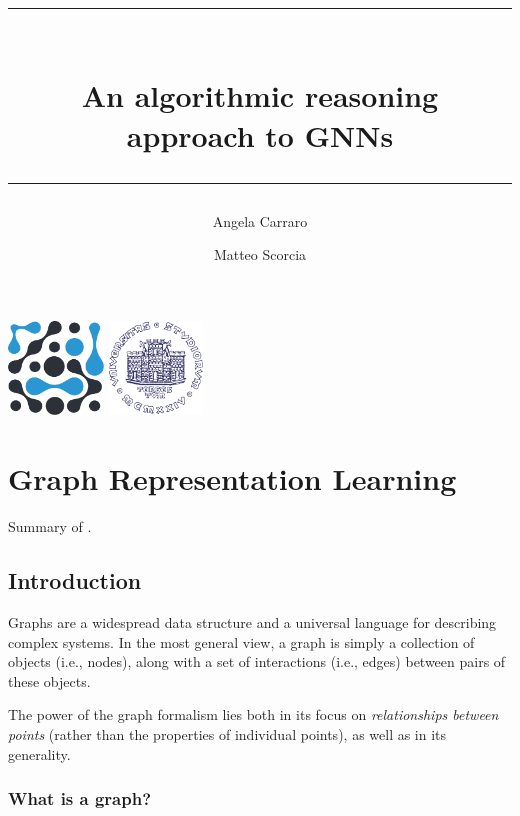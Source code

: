 \documentclass[10pt]{book}
\title{\rule{\textwidth}{0.4pt}\\\huge{An algorithmic reasoning\\approach to GNNs}\\\rule{\textwidth}{0.4pt}}
\author{\Large{Angela Carraro}}
\author{\Large{Matteo Scorcia}}
\affil{\Large{DSSC + IN20 - UniTS}}
\date{}
\begin{document}
\begin{minipage}[c][\textheight]{\textwidth}
    \maketitle
    
    \hspace*{20cm}

    \centering
    \includegraphics[height=2.5cm]{figures/logo_dssc_alt.pdf}
    \hspace*{1cm}
    \includegraphics[height=2.5cm]{figures/Logo_units_blu.pdf}

\end{minipage}
\newpage

\tableofcontents

\newpage

\chapter{Graph Representation Learning}

Summary of \cite{BookHamiltonGRL}.

\section{Introduction}
\label{sec:intro}

Graphs are a widespread data structure and a universal language for describing complex systems. In the most general view, a graph is simply a collection of objects (i.e., nodes), along with a set of interactions (i.e., edges) between pairs of these objects.

The power of the graph formalism lies both in its focus on \emph{relationships between points} (rather than the properties of individual points), as well as in its generality.


\subsection{What is a graph?}
\end{document}
